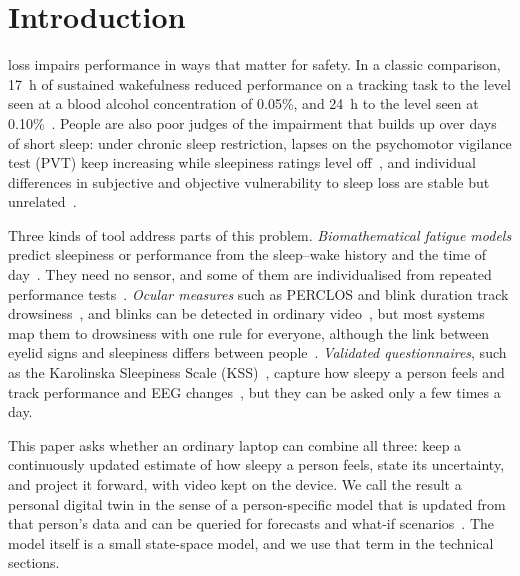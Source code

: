 \section{Introduction}
\label{sec:intro}

 loss impairs performance in ways that matter for safety. In a classic comparison, 17~h of sustained wakefulness reduced performance on a tracking task to the level seen at a blood alcohol concentration of 0.05\%, and 24~h to the level seen at 0.10\%~\cite{dawson1997fatigue}. People are also poor judges of the impairment that builds up over days of short sleep: under chronic sleep restriction, lapses on the psychomotor vigilance test (PVT) keep increasing while sleepiness ratings level off~\cite{vandongen2003cumulative}, and individual differences in subjective and objective vulnerability to sleep loss are stable but unrelated~\cite{leproult2003individual}.

Three kinds of tool address parts of this problem. \emph{Biomathematical fatigue models} predict sleepiness or performance from the sleep--wake history and the time of day~\cite{borbely1982two,akerstedt1997three,akerstedt2004predictions,hursh2004fatigue,mallis2004summary,dawson2011modelling}. They need no sensor, and some of them are individualised from repeated performance tests~\cite{olofsen2004nonlinear,vandongen2007optimization,rajaraman2008individualized,liu2017real,reifman2019twobalert}. \emph{Ocular measures} such as PERCLOS and blink duration track drowsiness~\cite{wierwille1994research,dinges1998evaluation,caffier2003experimental,schleicher2008blinks}, and blinks can be detected in ordinary video~\cite{soukupova2016real}, but most systems map them to drowsiness with one rule for everyone, although the link between eyelid signs and sleepiness differs between people~\cite{ingre2006subjective}. \emph{Validated questionnaires}, such as the Karolinska Sleepiness Scale (KSS)~\cite{akerstedt1990subjective}, capture how sleepy a person feels and track performance and EEG changes~\cite{kaida2006validation,akerstedt2014subjective}, but they can be asked only a few times a day.

This paper asks whether an ordinary laptop can combine all three: keep a continuously updated estimate of how sleepy a person feels, state its uncertainty, and project it forward, with video kept on the device. We call the result a personal digital twin in the sense of a person-specific model that is updated from that person's data and can be queried for forecasts and what-if scenarios~\cite{grieves2017digital,corralacero2020digital}. The model itself is a small state-space model, and we use that term in the technical sections.

